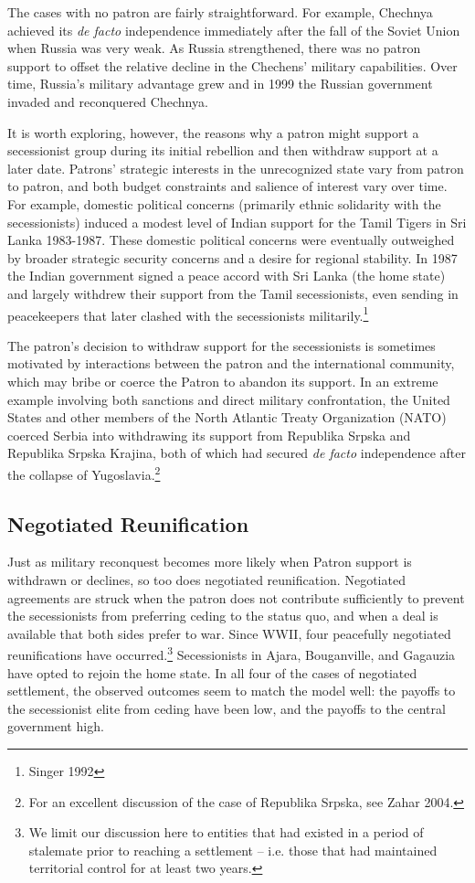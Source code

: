 \documentclass[12pt,letterpaper, notitlepage]{article}
\begin{document}
The cases with no patron are fairly straightforward. For example, Chechnya achieved its \emph{de facto} independence immediately after the fall of the Soviet Union when Russia was very weak.   As Russia strengthened, there was no patron support to offset the relative decline in the Chechens' military capabilities. Over time, Russia's military advantage grew and in 1999 the Russian government invaded and reconquered Chechnya.

It is worth exploring, however, the reasons why a patron might support a secessionist group during its initial rebellion and then withdraw support at a later date. Patrons' strategic interests in the unrecognized state vary from patron to patron, and both budget constraints and salience of interest vary over time. For example, domestic political concerns (primarily ethnic solidarity with the secessionists) induced a modest level of Indian support for the Tamil Tigers in Sri Lanka 1983-1987.  These domestic political concerns were eventually outweighed by broader strategic security concerns and a desire for regional stability. In 1987 the Indian government signed a peace accord with Sri Lanka (the home state) and largely withdrew their support from the Tamil secessionists, even sending in peacekeepers that later clashed with the secessionists militarily.\footnote{Singer 1992}

The patron's decision to withdraw support for the secessionists is sometimes motivated by interactions between the patron and the international community, which may bribe or coerce the Patron to abandon its support. In an extreme example involving both sanctions and direct military confrontation, the United States and other members of the North Atlantic Treaty Organization (NATO) coerced Serbia into withdrawing its support from Republika Srpska and Republika Srpska Krajina, both of which had secured \emph{de facto} independence after the collapse of Yugoslavia.\footnote{For an excellent discussion of the case of Republika Srpska, see Zahar 2004.} 

\subsection*{Negotiated Reunification}

Just as military reconquest becomes more likely when Patron support is withdrawn or declines, so too does negotiated reunification. Negotiated agreements are struck when the patron does not contribute sufficiently to prevent the secessionists from preferring ceding to the status quo, and when a deal is available that both sides prefer to war. Since WWII, four peacefully negotiated reunifications have occurred.\footnote{We limit our discussion here to entities that had existed in a period of stalemate prior to reaching a settlement -- i.e. those that had maintained territorial control for at least two years.} Secessionists in Ajara, Bouganville, and Gagauzia have opted to rejoin the home state.  In all four of the cases of negotiated settlement, the observed outcomes seem to match the model well: the payoffs to the secessionist elite from ceding have been low, and the payoffs to the central government high.
\end{document}
